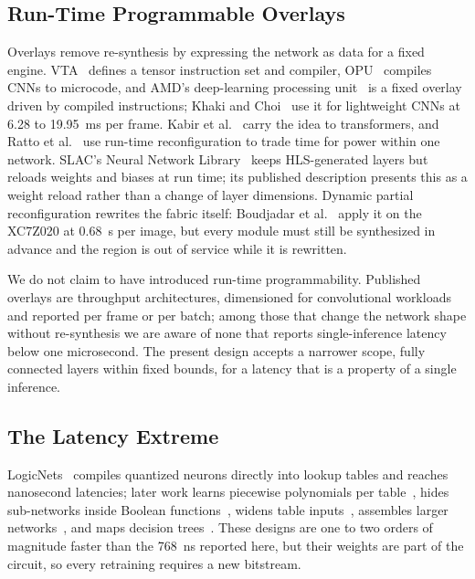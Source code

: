 \documentclass[final,5p,times,twocolumn]{elsarticle}
\begin{document}
\subsection{Run-Time Programmable Overlays}
\label{sec:overlays}
Overlays remove re-synthesis by expressing the network as data for a fixed
engine. VTA~\cite{Moreau2019} defines a tensor instruction set and compiler,
OPU~\cite{Yu2020,YuLight2020} compiles CNNs to microcode, and AMD's
deep-learning processing unit~\cite{AMDVitisAI} is a fixed overlay driven by
compiled instructions; Khaki and Choi~\cite{Khaki2025} use it for lightweight
CNNs at 6.28 to \SI{19.95}{\milli\second} per frame. Kabir et
al.~\cite{Kabir2026} carry the idea to transformers, and Ratto et
al.~\cite{Ratto2023} use run-time reconfiguration to trade time for power within
one network. SLAC's Neural Network Library~\cite{EzzaouiRahali2025} keeps
HLS-generated layers but reloads weights and biases at run time; its published
description presents this as a weight reload rather than a change of layer
dimensions. Dynamic partial reconfiguration rewrites the fabric itself:
Boudjadar et al.~\cite{Boudjadar2025} apply it on the XC7Z020 at
\SI{0.68}{\second} per image, but every module must still be synthesized in
advance and the region is out of service while it is rewritten.

We do not claim to have introduced run-time programmability. Published overlays
are throughput architectures, dimensioned for convolutional workloads and
reported per frame or per batch; among those that change the network shape
without re-synthesis we are aware of none that reports single-inference latency
below one microsecond. The present design accepts a narrower scope, fully
connected layers within fixed bounds, for a latency that is a property of a
single inference.

\subsection{The Latency Extreme}
LogicNets~\cite{Umuroglu2020} compiles quantized neurons directly into
lookup tables and reaches nanosecond latencies; later work learns piecewise
polynomials per table~\cite{Andronic2023}, hides sub-networks inside Boolean
functions~\cite{Andronic2024}, widens table inputs~\cite{Lou2024}, assembles
larger networks~\cite{Andronic2025}, and maps decision trees~\cite{Khataei2025}.
These designs are one to two orders of magnitude faster than the
\SI{768}{\nano\second} reported here, but their weights are part of the circuit,
so every retraining requires a new bitstream.
\end{document}
